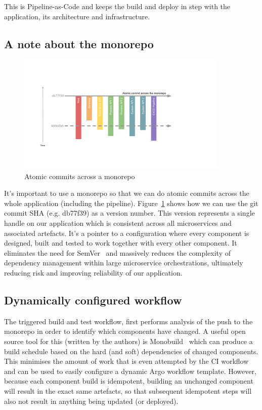 \documentclass[reprint,amsmath,amssymb,aps]{revtex4-1}
\begin{document}
This is Pipeline-as-Code and keeps the build and deploy in step with the application, its architecture and infrastructure.

\subsection{\label{sec:monorepo}A note about the monorepo}

\begin{figure}[t!]
	\includegraphics[width=0.9\textwidth]{figs/monorepo}
	\caption{Atomic commits across a monorepo}
	\label{fig:monorepo}
\end{figure}

It’s important to use a monorepo so that we can do atomic commits across the whole application (including the pipeline). Figure~\ref{fig:monorepo} shows how we can use the git commit SHA (e.g. db77f39) as a version number. This version represents a single handle on our application which is consistent across all microservices and associated artefacts. It’s a pointer to a configuration where every component is designed, built and tested to work together with every other component. It eliminates the need for SemVer~\cite{Semantic13:online} and massively reduces the complexity of dependency management within large microservice orchestrations, ultimately reducing risk and improving reliability of our application.

\subsection{\label{sec:dynamicworkflow}Dynamically configured workflow}

The triggered build and test workflow, first performs analysis of the push to the monorepo in order to identify which components have changed. A useful open source tool for this (written by the authors) is Monobuild~\cite{charypar24:online} which can produce a build schedule based on the hard (and soft) dependencies of changed components. This minimises the amount of work that is even attempted by the CI workflow and can be used to easily configure a dynamic Argo workflow template. However, because each component build is idempotent, building an unchanged component will result in the exact same artefacts, so that subsequent idempotent steps will also not result in anything being updated (or deployed).
\end{document}
